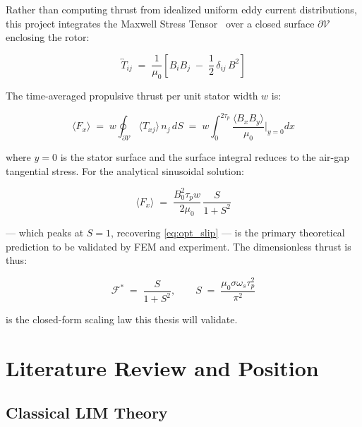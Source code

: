 \documentclass[12pt,letterpaper]{article}
\begin{document}
Rather than computing thrust from idealized uniform eddy current distributions,
this project integrates the Maxwell Stress Tensor~\cite{Griffiths2017} over a closed
surface $\partial\mathcal{V}$ enclosing the rotor:

\begin{equation}
  \overleftrightarrow{T}_{ij} \;=\; \frac{1}{\mu_0}
  \left[B_i B_j \;-\; \frac{1}{2}\,\delta_{ij}\,B^2\right]
  \label{eq:mst}
\end{equation}

The time-averaged propulsive thrust per unit stator width $w$ is:

\begin{equation}
  \langle F_x \rangle \;=\; w \oint_{\partial\mathcal{V}}
  \langle T_{xj}\rangle\, n_j\, dS
  \;=\; w \int_0^{2\tau_p}
  \frac{\langle B_x B_y\rangle}{\mu_0}\Bigg|_{y=0}\!\! dx
  \label{eq:thrust}
\end{equation}

where $y = 0$ is the stator surface and the surface integral reduces to the
air-gap tangential stress. For the analytical sinusoidal solution:

\begin{equation}
  \langle F_x \rangle \;=\; \frac{B_0^2 \tau_p w}{2\mu_0}\,
  \frac{S}{1 + S^2}
  \label{eq:thrust_analytical}
\end{equation}

 — which peaks at $S = 1$, recovering \cref{eq:opt_slip} —
is the primary theoretical prediction to be validated by FEM and experiment.
The dimensionless thrust is thus:

\begin{equation}
  \boxed{\mathcal{F}^* \;=\; \frac{S}{1 + S^2}, \qquad
  S \;=\; \frac{\mu_0\sigma\omega_s\tau_p^2}{\pi^2}}
  \label{eq:scaling_law}
\end{equation}

 is the closed-form scaling law this thesis will validate.

\section{Literature Review and Position}

\subsection{Classical LIM Theory}
\end{document}
